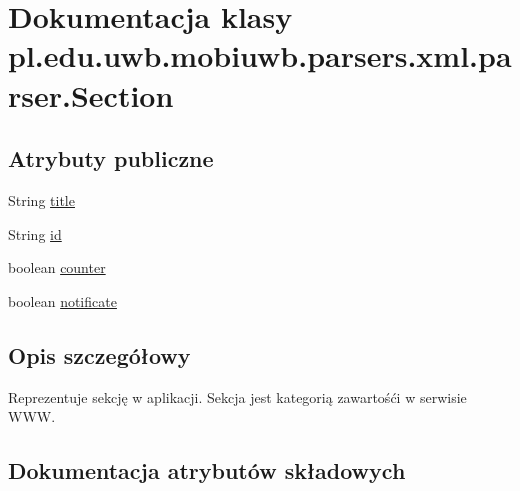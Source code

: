 \hypertarget{classpl_1_1edu_1_1uwb_1_1mobiuwb_1_1parsers_1_1xml_1_1parser_1_1_section}{}\section{Dokumentacja klasy pl.\+edu.\+uwb.\+mobiuwb.\+parsers.\+xml.\+parser.\+Section}
\label{classpl_1_1edu_1_1uwb_1_1mobiuwb_1_1parsers_1_1xml_1_1parser_1_1_section}
\subsection*{Atrybuty publiczne}
\begin{DoxyCompactItemize}
\item 
String \hyperlink{classpl_1_1edu_1_1uwb_1_1mobiuwb_1_1parsers_1_1xml_1_1parser_1_1_section_abf4d72dc16a01248170787330e39a7dc}{title}
\item 
String \hyperlink{classpl_1_1edu_1_1uwb_1_1mobiuwb_1_1parsers_1_1xml_1_1parser_1_1_section_ad7645c37b1b20893ea58e06ffd0cbc73}{id}
\item 
boolean \hyperlink{classpl_1_1edu_1_1uwb_1_1mobiuwb_1_1parsers_1_1xml_1_1parser_1_1_section_a9ae231ee804f86e1b8406f7c1e9d0989}{counter}
\item 
boolean \hyperlink{classpl_1_1edu_1_1uwb_1_1mobiuwb_1_1parsers_1_1xml_1_1parser_1_1_section_a679d58ae8eb489dd5e1c747e55cd9e6a}{notificate}
\end{DoxyCompactItemize}


\subsection{Opis szczegółowy}
Reprezentuje sekcję w aplikacji. Sekcja jest kategorią zawartośći w serwisie W\+W\+W. 

\subsection{Dokumentacja atrybutów składowych}
\hypertarget{classpl_1_1edu_1_1uwb_1_1mobiuwb_1_1parsers_1_1xml_1_1parser_1_1_section_a9ae231ee804f86e1b8406f7c1e9d0989}{}
